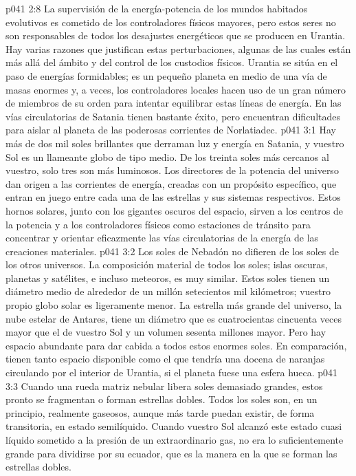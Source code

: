 \vs p041 2:8 La supervisión de la energía\hyp{}potencia de los mundos habitados evolutivos es cometido de los controladores físicos mayores, pero estos seres no son responsables de todos los desajustes energéticos que se producen en Urantia. Hay varias razones que justifican estas perturbaciones, algunas de las cuales están más allá del ámbito y del control de los custodios físicos. Urantia se sitúa en el paso de energías formidables; es un pequeño planeta en medio de una vía de masas enormes y, a veces, los controladores locales hacen uso de un gran número de miembros de su orden para intentar equilibrar estas líneas de energía. En las vías circulatorias de Satania tienen bastante éxito, pero encuentran dificultades para aislar al planeta de las poderosas corrientes de Norlatiadec.
\vs p041 3:1 Hay más de dos mil soles brillantes que derraman luz y energía en Satania, y vuestro Sol es un llameante globo de tipo medio. De los treinta soles más cercanos al vuestro, solo tres son más luminosos. Los directores de la potencia del universo dan origen a las corrientes de energía, creadas con un propósito específico, que entran en juego entre cada una de las estrellas y sus sistemas respectivos. Estos hornos solares, junto con los gigantes oscuros del espacio, sirven a los centros de la potencia y a los controladores físicos como estaciones de tránsito para concentrar y orientar eficazmente las vías circulatorias de la energía de las creaciones materiales.
\vs p041 3:2 Los soles de Nebadón no difieren de los soles de los otros universos. La composición material de todos los soles; islas oscuras, planetas y satélites, e incluso meteoros, es muy similar. Estos soles tienen un diámetro medio de alrededor de un millón setecientos mil kilómetros; vuestro propio globo solar es ligeramente menor. La estrella más grande del universo, la nube estelar de Antares, tiene un diámetro que es cuatrocientas cincuenta veces mayor que el de vuestro Sol y un volumen sesenta millones mayor. Pero hay espacio abundante para dar cabida a todos estos enormes soles. En comparación, tienen tanto espacio disponible como el que tendría una docena de naranjas circulando por el interior de Urantia, si el planeta fuese una esfera hueca.
\vs p041 3:3 \pc Cuando una rueda matriz nebular libera soles demasiado grandes, estos pronto se fragmentan o forman estrellas dobles. Todos los soles son, en un principio, realmente gaseosos, aunque más tarde puedan existir, de forma transitoria, en estado semilíquido. Cuando vuestro Sol alcanzó este estado cuasi líquido sometido a la presión de un extraordinario gas, no era lo suficientemente grande para dividirse por su ecuador, que es la manera en la que se forman las estrellas dobles.
